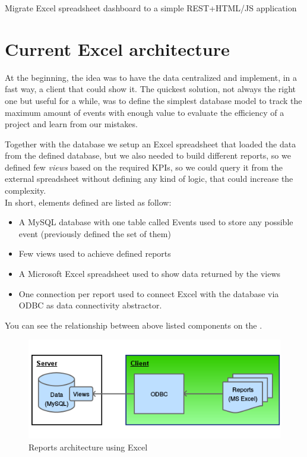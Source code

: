 \begin{part}{Migrate Excel spreadsheet dashboard to a simple REST+HTML/JS
application}
\label{c_phaseone}

\chapter{Current Excel architecture}
At the beginning, the idea was to have the data centralized
\label{t_main_objective} and implement, in a fast way, a client that could show
it. The quickest solution, not always the right one but useful for a while, was
to define the simplest database model to  track the maximum amount of events
with enough value to evaluate the  efficiency of a project and learn from our
mistakes.

Together with the database  we setup an Excel spreadsheet that loaded
the data from the defined database, but  we also needed to build different
reports, so we defined few \emph{views} based  on the required KPIs, so we could
query it from the external spreadsheet  without defining any kind of logic,
that could increase the complexity.\\ 

In short, elements defined are listed as follow:
\begin{itemize}
  \item A MySQL database with one table called Events used to store any possible
  event (previously defined the set of them)
  \item Few views used to achieve defined reports
  \item A Microsoft Excel spreadsheet used to show data returned by the views
  \item One connection per report used to connect Excel with the database
  via ODBC as data connectivity abstractor. 
\end{itemize}

You can see the relationship between above listed components on the 
.
 
\begin{figure}[ht!]
	\centering
   	\includegraphics[width=1\textwidth]{./resources/excel_architecture.png}
   	\caption{Reports architecture using Excel}
   	\label{f_excel_architecture}
\end{figure}


\end{part}
